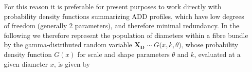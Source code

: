 For this reason it is preferable for present purposes to work directly with probability density functions summarizing ADD profiles, which have low degrees of freedom (generally 2 parameters), and therefore minimal redundancy. In the following we therefore represent the population of diameters within a fibre bundle by the gamma-distributed random variable $\mathbf{X_D} \sim G(x,k,\theta$), whose probability density function $G(x)$ for scale and shape parameters $\theta$ and $k$, evaluated at a given diameter $x$, is given by 


